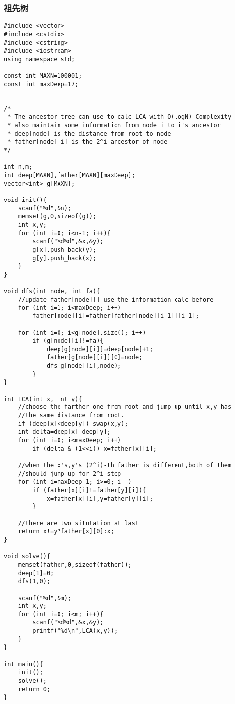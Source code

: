 \subsubsection{祖先树}
\begin{verbatim}
#include <vector>
#include <cstdio>
#include <cstring>
#include <iostream>
using namespace std;

const int MAXN=100001;
const int maxDeep=17;


/*
 * The ancestor-tree can use to calc LCA with O(logN) Complexity
 * also maintain some information from node i to i's ancestor
 * deep[node] is the distance from root to node
 * father[node][i] is the 2^i ancestor of node
*/

int n,m;
int deep[MAXN],father[MAXN][maxDeep];
vector<int> g[MAXN];

void init(){
    scanf("%d",&n);
    memset(g,0,sizeof(g));
    int x,y;
    for (int i=0; i<n-1; i++){
        scanf("%d%d",&x,&y);
        g[x].push_back(y);
        g[y].push_back(x);
    }
}

void dfs(int node, int fa){
    //update father[node][] use the information calc before
    for (int i=1; i<maxDeep; i++) 
        father[node][i]=father[father[node][i-1]][i-1];

    for (int i=0; i<g[node].size(); i++)
        if (g[node][i]!=fa){
            deep[g[node][i]]=deep[node]+1;
            father[g[node][i]][0]=node;
            dfs(g[node][i],node);
        }
}

int LCA(int x, int y){
    //choose the farther one from root and jump up until x,y has 
    //the same distance from root.
    if (deep[x]<deep[y]) swap(x,y);
    int delta=deep[x]-deep[y];
    for (int i=0; i<maxDeep; i++)
        if (delta & (1<<i)) x=father[x][i];

    //when the x's,y's (2^i)-th father is different,both of them
    //should jump up for 2^i step
    for (int i=maxDeep-1; i>=0; i--)
        if (father[x][i]!=father[y][i]){
            x=father[x][i],y=father[y][i];
        }

    //there are two situtation at last
    return x!=y?father[x][0]:x;
}

void solve(){
    memset(father,0,sizeof(father));
    deep[1]=0;
    dfs(1,0);

    scanf("%d",&m);
    int x,y;
    for (int i=0; i<m; i++){
        scanf("%d%d",&x,&y);
        printf("%d\n",LCA(x,y));
    }
}

int main(){
    init();
    solve();
    return 0;
}
\end{verbatim}

